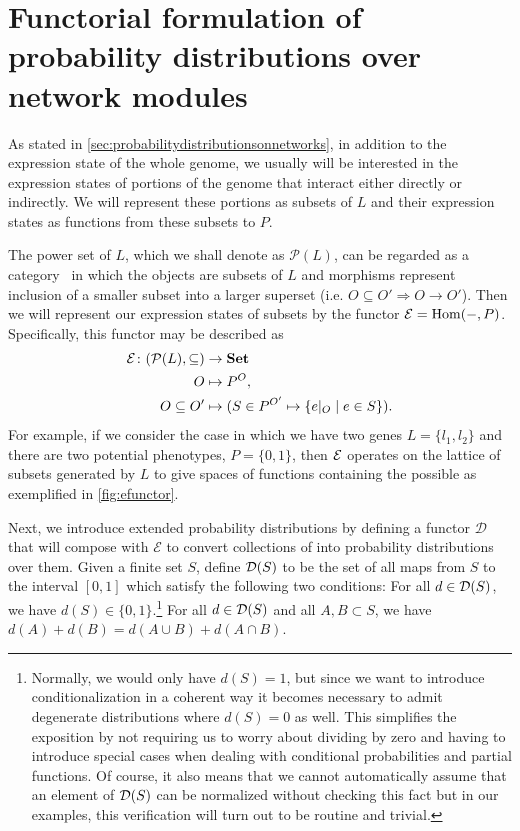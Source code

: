 
\section{Functorial formulation of probability distributions over network modules}\label{secsupp:probabilitydistributionsonnetworks}

As stated in \ref{sec:probabilitydistributionsonnetworks}, in addition to the expression state of the whole genome, we usually will be interested in the expression states of portions of the genome that interact either directly or indirectly.  We will represent these portions as subsets of $L$ and their expression states as functions from these subsets to $P$.

The power set of $L$, which we shall denote as $\mathcal{P}(L)$, can be regarded  as a category~\cite{Lane1998,MacLane1992,Awodey2006,Abramsky2011} in which the objects are subsets of $L$ and morphisms represent inclusion of a smaller subset into a larger superset (i.e. $O \subseteq O' \Rightarrow O \rightarrow O'$).  Then we will represent our expression states of subsets by the functor $\mathcal{E} = \mathrm{Hom}(-,P)$.  Specifically, this functor may be described as
\begin{equation}\label{eq:gpfunctor}
\begin{split}
\expr \colon (\mathcal{P}(L), \subseteq) &\to \mathbf{Set} \\
O &\mapsto P^O,\\
O \subseteq O' &\mapsto (S \in P^{O'} \mapsto \{e|_O \mid e \in S\}). %
\end{split}
\end{equation}
For example, if we consider the case in which we have two genes $L=\{l_1,l_2\}$ and there are two potential phenotypes, $P=\{0,1\}$, then $\mathcal{E}$ operates on the lattice of subsets generated by $L$ to give spaces of functions containing the possible \gnpm{} as exemplified in \ref{fig:efunctor}.

Next, we introduce extended probability distributions by defining a functor $\mathcal{D}$ that will compose with $\mathcal{E}$ to convert collections of \gnpm{} into probability distributions over them.  Given a finite set $S$, define $\mathcal{D}(S)$ to be the set of all maps from $S$ to the interval $[0,1]$ which satisfy the following two conditions:  For all $d \in \mathcal{D}(S)$, we have $d(S) \in \{0,1\}$.\footnote{Normally, we would only have $d(S) = 1$, but since we want to introduce conditionalization in a coherent way it becomes necessary to admit degenerate distributions where $d(S) = 0$ as well. This simplifies the exposition by not requiring us to worry about dividing by zero and having to introduce special cases when dealing with conditional probabilities and partial functions.  Of course, it also means that we cannot automatically assume that an element of $\mathcal{D}(S)$ can be normalized without checking this fact but in our examples, this verification will turn out to be routine and trivial.}  For all  $d \in \mathcal{D}(S)$ and all $A, B \subset S$, we have $d(A) + d(B) = d(A \cup B) + d(A \cap B)$.

